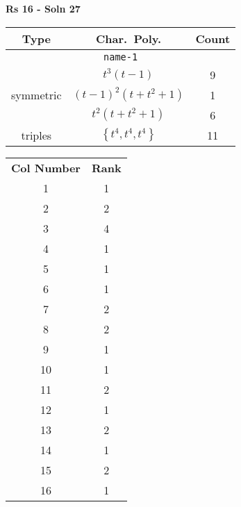 \documentclass{article}
\begin{document}
    \textbf{Rs 16 - Soln 27}
    \begin{table}
    \begin{tabular}{|c|c|c|}
    \hline
    \textbf{Type} & \textbf{Char.~Poly.} & \textbf{Count} \\
    \hline \multicolumn{3}{|c|}{\texttt{name-1}} \\ \hline
    \multirow{3}{*}{symmetric}
    & $t^3(t - 1)$ & 9 \\
    & $(t - 1)^2(t + t^2 + 1)$ & 1 \\
    & $t^2(t + t^2 + 1)$ & 6 \\
    \hline
    \multirow{1}{*}{triples}
    & $\left\{t^4,t^4,t^4\right\}$ & 11 \\
    \hline
    \end{tabular}
    \end{table}
    \begin{table}
    \begin{tabular}{|c|c|}
    \hline
    \textbf{Col Number} & \textbf{Rank}\\
    1 & 1 \\ 
    2 & 2 \\ 
    3 & 4 \\ 
    4 & 1 \\ 
    5 & 1 \\ 
    6 & 1 \\ 
    7 & 2 \\ 
    8 & 2 \\ 
    9 & 1 \\ 
    10 & 1 \\ 
    11 & 2 \\ 
    12 & 1 \\ 
    13 & 2 \\ 
    14 & 1 \\ 
    15 & 2 \\ 
    16 & 1 \\ 
    \hline
    \end{tabular}
    \end{table}
    \newpage
\end{document}
